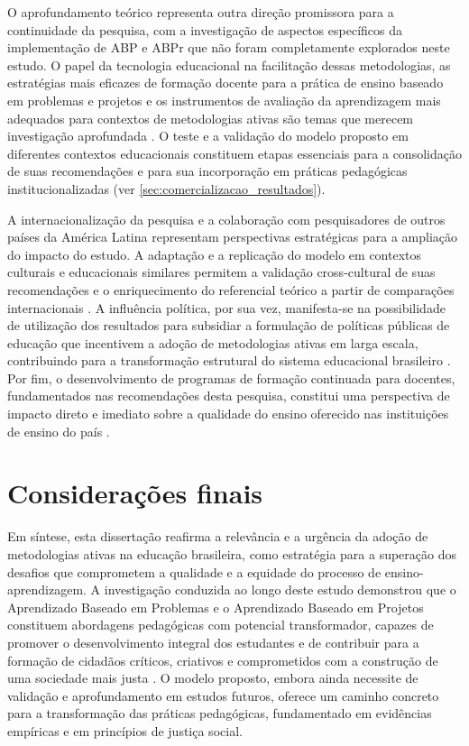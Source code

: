 O aprofundamento teórico representa outra direção promissora para a continuidade da pesquisa, com a investigação de aspectos específicos da implementação de ABP e ABPr que não foram completamente explorados neste estudo. O papel da tecnologia educacional na facilitação dessas metodologias, as estratégias mais eficazes de formação docente para a prática de ensino baseado em problemas e projetos e os instrumentos de avaliação da aprendizagem mais adequados para contextos de metodologias ativas são temas que merecem investigação aprofundada \cite{VEIGA2014}. O teste e a validação do modelo proposto em diferentes contextos educacionais constituem etapas essenciais para a consolidação de suas recomendações e para sua incorporação em práticas pedagógicas institucionalizadas (ver \ref{sec:comercializacao_resultados}).

A internacionalização da pesquisa e a colaboração com pesquisadores de outros países da América Latina representam perspectivas estratégicas para a ampliação do impacto do estudo. A adaptação e a replicação do modelo em contextos culturais e educacionais similares permitem a validação cross-cultural de suas recomendações e o enriquecimento do referencial teórico a partir de comparações internacionais \cite{BACICH2018}. A influência política, por sua vez, manifesta-se na possibilidade de utilização dos resultados para subsidiar a formulação de políticas públicas de educação que incentivem a adoção de metodologias ativas em larga escala, contribuindo para a transformação estrutural do sistema educacional brasileiro \cite{TEODORO2024}. Por fim, o desenvolvimento de programas de formação continuada para docentes, fundamentados nas recomendações desta pesquisa, constitui uma perspectiva de impacto direto e imediato sobre a qualidade do ensino oferecido nas instituições de ensino do país \cite{SOUSA2025}.

\section{Considerações finais}
\label{sec:consideracoes_finais}

Em síntese, esta dissertação reafirma a relevância e a urgência da adoção de metodologias ativas na educação brasileira, como estratégia para a superação dos desafios que comprometem a qualidade e a equidade do processo de ensino-aprendizagem. A investigação conduzida ao longo deste estudo demonstrou que o Aprendizado Baseado em Problemas e o Aprendizado Baseado em Projetos constituem abordagens pedagógicas com potencial transformador, capazes de promover o desenvolvimento integral dos estudantes e de contribuir para a formação de cidadãos críticos, criativos e comprometidos com a construção de uma sociedade mais justa \cite{BACICH2018}. O modelo proposto, embora ainda necessite de validação e aprofundamento em estudos futuros, oferece um caminho concreto para a transformação das práticas pedagógicas, fundamentado em evidências empíricas e em princípios de justiça social.

